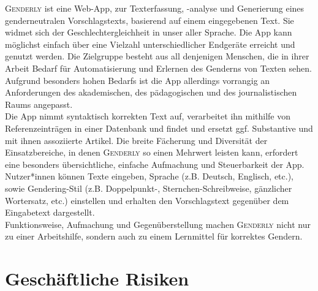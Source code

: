 \documentclass[paper=a4, parskip=half]{scrreprt}
\begin{document}
\textsc{Genderly} ist eine Web-App, zur Texterfassung, -analyse und Generierung eines genderneutralen Vorschlagstexts, basierend auf einem eingegebenen Text. Sie widmet sich der Geschlechtergleichheit in unser aller Sprache. Die App kann möglichst einfach über eine Vielzahl unterschiedlicher Endgeräte erreicht und genutzt werden. Die Zielgruppe besteht aus all denjenigen Menschen, die in ihrer Arbeit Bedarf für Automatisierung und Erlernen des Genderns von Texten sehen. Aufgrund besonders hohen Bedarfs ist die App allerdings vorrangig an Anforderungen des akademischen, des pädagogischen und des journalistischen Raums angepasst.\\
Die App nimmt syntaktisch korrekten Text auf, verarbeitet ihn mithilfe von Referenzeinträgen in einer Datenbank und findet und ersetzt ggf. Substantive und mit ihnen assoziierte Artikel. Die breite Fächerung und Diversität der Einsatzbereiche, in denen \textsc{Genderly} so einen Mehrwert leisten kann, erfordert eine besonders übersichtliche, einfache Aufmachung und Steuerbarkeit der App. Nutzer*innen können Texte eingeben, Sprache (z.B. Deutsch, Englisch, etc.), sowie Gendering-Stil (z.B. Doppelpunkt-, Sternchen-Schreibweise, gänzlicher Wortersatz, etc.) einstellen und erhalten den Vorschlagstext gegenüber dem Eingabetext dargestellt.\\
Funktionsweise, Aufmachung und Gegenüberstellung machen \textsc{Genderly} nicht nur zu einer Arbeitshilfe, sondern auch zu einem Lernmittel für korrektes Gendern.

\pagebreak

\section{Geschäftliche Risiken}
\end{document}
